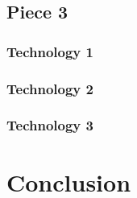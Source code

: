 \documentclass[letterpaper,10pt,titlepage,draftclsnofoot,onecolumn,onesided] {IEEEtran}
\begin{document}
\subsection{Piece 3}
\subsubsection{Technology 1}
\subsubsection{Technology 2}
\subsubsection{Technology 3}

\section{Conclusion}



\end{document}
